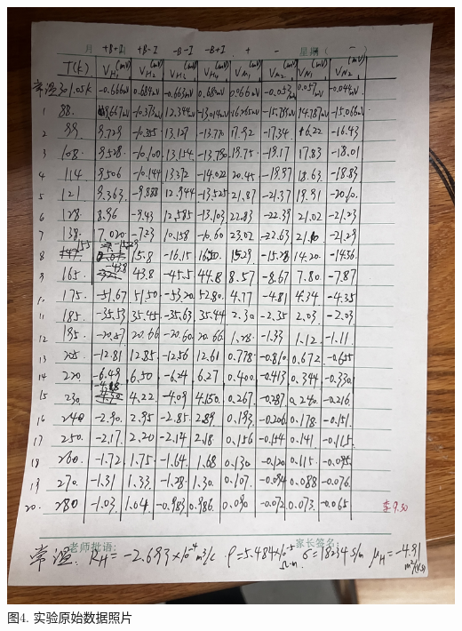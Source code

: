 \documentclass[UTF8]{ctexart}
\begin{document}
\begin{minipage}[!ht]{1\linewidth}
    \centering
    \includegraphics[width=1\textwidth]{photo.jpeg}\\
    {\small{
        图4. 实验原始数据照片
    }}
    \vspace{10pt}
\end{minipage}\\
\end{document}
